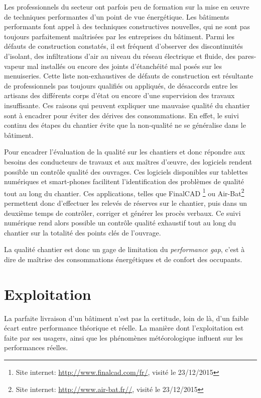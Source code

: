 Les professionnels du secteur ont parfois peu de formation sur la mise en œuvre de techniques performantes d'un point de vue énergétique. Les bâtiments performants font appel à des techniques constructives nouvelles, qui ne sont pas toujours parfaitement maîtrisées par les entreprises du bâtiment. Parmi les défauts de construction constatés, il est fréquent d'observer des discontinuités d'isolant, des infiltrations d'air au niveau du réseau électrique et fluide, des pares-vapeur mal installés ou encore des joints d'étanchéité mal posés sur les menuiseries. Cette liste non-exhaustives de défauts de construction est résultante de professionnels pas toujours qualifiés ou appliqués, de désaccords entre les artisans des différents corps d'état ou encore d'une supervision des travaux insuffisante. Ces raisons qui peuvent expliquer une mauvaise qualité du chantier sont à encadrer pour éviter des dérives des consommations. En effet, le suivi continu des étapes du chantier évite que la non-qualité ne se généralise dans le bâtiment. 

Pour encadrer l'évaluation de la qualité sur les chantiers et donc répondre aux besoins des conducteurs de travaux et aux maîtres d'œuvre, des logiciels rendent possible un contrôle qualité des ouvrages. Ces logiciels disponibles sur tablettes numériques et smart-phones facilitent l'identification des problèmes de qualité tout au long du chantier. Ces applications, telles que FinalCAD \footnote{Site internet: \url{http://www.finalcad.com/fr/}, visité le 23/12/2015} ou Air-Bat\footnote{Site internet: \url{http://www.air-bat.fr//}, visité le 23/12/2015} permettent donc d'effectuer les relevés de réserves sur le chantier, puis dans un deuxième temps de contrôler, corriger et générer les procès verbaux. Ce suivi numérique rend alors possible un contrôle qualité exhaustif tout au long du chantier sur la totalité des points clés de l'ouvrage.

La qualité chantier est donc un gage de limitation du \textit{performance gap}, c'est à dire de maîtrise des consommations énergétiques et de confort des occupants.

\section{Exploitation}

La parfaite livraison d'un bâtiment n'est pas la certitude, loin de là, d'un faible écart entre performance théorique et réelle. La manière dont l'exploitation est faite par ses usagers, ainsi que les phénomènes météorologique influent sur les performances réelles.

